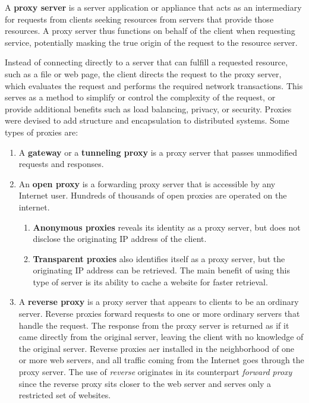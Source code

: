 \documentclass{article}
\begin{document}
  \begin{definition}
  A \textbf{proxy server} is a server application or appliance that acts as an intermediary for requests from clients seeking resources from servers that provide those resources. A proxy server thus functions on behalf of the client when requesting service, potentially masking the true origin of the request to the resource server. 

  Instead of connecting directly to a server that can fulfill a requested resource, such as a file or web page, the client directs the request to the proxy server, which evaluates the request and performs the required network transactions. This serves as a method to simplify or control the complexity of the request, or provide additional benefits such as load balancing, privacy, or security. Proxies were devised to add structure and encapsulation to distributed systems. Some types of proxies are: 
  \begin{enumerate}
      \item A \textbf{gateway} or a \textbf{tunneling proxy} is a proxy server that passes unmodified requests and responses. 
      \item An \textbf{open proxy} is a forwarding proxy server that is accessible by any Internet user. Hundreds of thousands of open proxies are operated on the internet. 
      \begin{enumerate}
          \item \textbf{Anonymous proxies} reveals its identity as a proxy server, but does not disclose the originating IP address of the client. 
          \item \textbf{Transparent proxies} also identifies itself as a proxy server, but the originating IP address can be retrieved. The main benefit of using this type of server is its ability to cache a website for faster retrieval. 
      \end{enumerate}
      \item A \textbf{reverse proxy} is a proxy server that appears to clients to be an ordinary server. Reverse proxies forward requests to one or more ordinary servers that handle the request. The response from the proxy server is returned as if it came directly from the original server, leaving the client with no knowledge of the original server. Reverse proxies aer installed in the neighborhood of one or more web servers, and all traffic coming from the Internet goes through the proxy server. The use of \textit{reverse} originates in its counterpart \textit{forward proxy} since the reverse proxy sits closer to the web server and serves only a restricted set of websites. 

\end{enumerate}
\end{definition}
\end{document}
